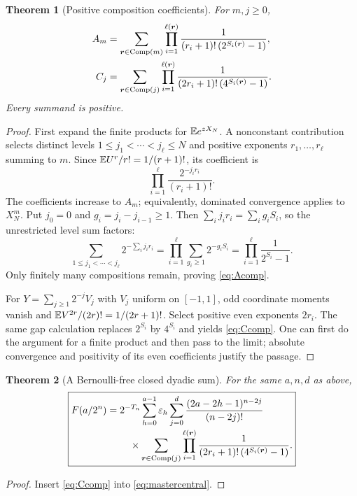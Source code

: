 \documentclass[11pt,oneside]{article}
\newtheorem{theorem}{Theorem}[section]
\theoremstyle{definition}\newtheorem{definition}[theorem]{Definition}
\theoremstyle{remark}\newtheorem{remark}[theorem]{Remark}
\begin{document}
\begin{theorem}[Positive composition coefficients]
\label{thm:compositioncoeff}
For $m,j\ge0$,
\begin{align}
 A_m&=\sum_{\boldsymbol r\in\operatorname{Comp}(m)}
       \prod_{i=1}^{\ell(\boldsymbol r)}
       \frac{1}{(r_i+1)!\,(2^{S_i(\boldsymbol r)}-1)},
 \label{eq:Acomp}\\
 C_j&=\sum_{\boldsymbol r\in\operatorname{Comp}(j)}
       \prod_{i=1}^{\ell(\boldsymbol r)}
       \frac{1}{(2r_i+1)!\,(4^{S_i(\boldsymbol r)}-1)}.
 \label{eq:Ccomp}
\end{align}
Every summand is positive.
\end{theorem}
\begin{proof}
First expand the finite products for $\mathbb E e^{zX_N}$. A nonconstant
contribution selects distinct levels $1\le j_1<\cdots<j_\ell\le N$ and
positive exponents $r_1,\ldots,r_\ell$ summing to $m$. Since
$\mathbb E U^r/r!=1/(r+1)!$, its coefficient is
\[
 \prod_{i=1}^\ell\frac{2^{-j_ir_i}}{(r_i+1)!}.
\]
The coefficients increase to $A_m$; equivalently, dominated convergence
applies to $X_N^m$. Put $j_0=0$ and $g_i=j_i-j_{i-1}\ge1$. Then
$\sum_i j_ir_i=\sum_i g_iS_i$, so the unrestricted level sum factors:
\begin{equation}
 \sum_{1\le j_1<\cdots<j_\ell}2^{-\sum_i j_ir_i}
 =\prod_{i=1}^{\ell}\sum_{g_i\ge1}2^{-g_iS_i}
 =\prod_{i=1}^{\ell}\frac{1}{2^{S_i}-1}.
 \label{eq:gaps}
\end{equation}
Only finitely many compositions remain, proving \eqref{eq:Acomp}.

For $Y=\sum_{j\ge1}2^{-j}V_j$ with $V_j$ uniform on $[-1,1]$, odd
coordinate moments vanish and
$\mathbb E V^{2r}/(2r)!=1/(2r+1)!$. Select positive even exponents $2r_i$.
The same gap calculation replaces $2^{S_i}$ by $4^{S_i}$ and yields
\eqref{eq:Ccomp}. One can first do the argument for a finite product and
then pass to the limit; absolute convergence and positivity of its even
coefficients justify the passage.
\end{proof}

\begin{theorem}[A Bernoulli-free closed dyadic sum]
\label{thm:compositionvalue}
For the same $a,n,d$ as above,
\begin{equation}
 \boxed{\begin{aligned}
 F(a/2^n)={}&2^{-T_n}\sum_{h=0}^{a-1}\varepsilon_h
   \sum_{j=0}^{d}\frac{(2a-2h-1)^{n-2j}}{(n-2j)!}\\[-0.2em]
 &\hspace{1em}\times
 \sum_{\boldsymbol r\in\operatorname{Comp}(j)}
 \prod_{i=1}^{\ell(\boldsymbol r)}
 \frac{1}{(2r_i+1)!\,(4^{S_i(\boldsymbol r)}-1)}.
 \end{aligned}}
 \label{eq:compositionvalue}
\end{equation}
\end{theorem}
\begin{proof}
Insert \eqref{eq:Ccomp} into \eqref{eq:mastercentral}.
\end{proof}
\end{document}
